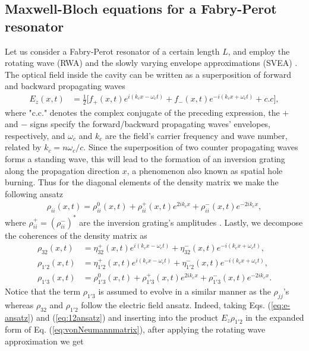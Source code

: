 \documentclass[twocolumn,secnumarabic,amssymb, nobibnotes, aps, prd]{revtex4-1}
\begin{document}
\subsection{Maxwell-Bloch equations for a Fabry-Perot resonator} 
\label{subsec:mbforfpresonator}
Let us consider a Fabry-Perot resonator of a certain length $L$, and employ the rotating wave (RWA) and the slowly varying envelope approximations (SVEA) \cite{boyd2003nonlinear,gordon2008multimode}. The optical field inside the cavity can be written as a superposition of forward and backward propagating waves
\begin{align}
E_z(x,t) &= \frac{1}{2} \big [ f_{+}(x,t) e^{i(k_c x-\omega_c t)} + f_{-}(x,t) e^{-i(k_c x+\omega_c t)} + c.c \big],\label{eq:e-ansatz}
\end{align}
where "c.c." denotes the complex conjugate of the preceding expression, the $+$ and $-$ signs specify the forward/backward propagating waves' envelopes, respectively, and $\omega_c$  and $k_c$ are the field's  carrier frequency and wave number, related by $k_c = n \omega_c  / c$. Since the superposition of two counter propagating waves forms a standing wave, this will lead to the formation of an inversion grating along the propagation direction $x$, a phenomenon also known as spatial hole burning. Thus for the diagonal elements of the density matrix we make the following ansatz
\begin{align}
\rho_{ii}(x,t) = \rho_{ii}^0(x,t) + \rho_{ii}^+(x,t) e^{2ik_c x} + \rho_{ii}^-(x,t)e^{-2ik_c x}, \label{eq:ii-ansatz}
\end{align}
where $\rho_{ii}^+ = (\rho_{ii}^-)^*$ are the inversion grating's amplitudes \cite{wang2007coherent}. Lastly, we decompose the coherences of the density matrix as
\begin{subequations}
	\label{eq:cohansatz}
	\begin{align}
	\rho_{32}(x,t) &= \eta_{32}^{+}(x,t)e^{i(k_cx-\omega_ct)} + \eta_{32}^{-}(x,t)e^{-i(k_c x+\omega_c t)}, \label{eq:32ansatz} \\
	\rho_{1'2}(x,t) &= \eta_{1'2}^{+}(x,t)e^{i(k_c x - \omega_c t)} + \eta_{1'2}^{-}(x,t)e^{-i(k_c x+\omega_c t)}, \label{eq:12ansatz} \\
	\rho_{1'3}(x,t) &= \rho_{1'3}^0(x,t) + \rho_{1'3}^{+}(x,t) e^{2ik_cx} +  \rho_{1'3}^{-}(x,t) e^{-2ik_cx}.   \label{eq:13ansatz}
	\end{align}
\end{subequations}
Notice that the term $\rho_{1'3}$ is assumed to evolve in a similar manner as the $\rho_{jj}$'s whereas $\rho_{32}$ and $\rho_{1'2}$ follow the electric field ansatz. Indeed, taking Eqs. (\ref{eq:e-ansatz}) and (\ref{eq:12ansatz}) and inserting into the product $E_z\rho_{1'2}$ in the expanded form of Eq. (\ref{eq:vonNeumannmatrix}), after applying the rotating wave approximation we get
\end{document}
